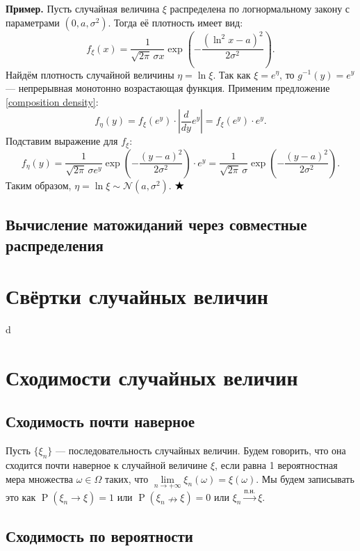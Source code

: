 \documentclass[12pt]{article}
\numberwithin{theorem}{section}
\theoremstyle{definition}
\newenvironment{example}{\indent \textbf{Пример.}}{$ \hfill \bigstar $}
\newcommand{\defin}[2]{\hypertarget{#2}{{\color{red} #1}}}
\newcommand{\prob}{\operatorname{P}}
\begin{document}
	\begin{example}
		Пусть случайная величина \( \xi \) распределена по логнормальному закону с параметрами \( (0, a, \sigma^2) \). Тогда её плотность имеет вид:
		\[
		f_\xi(x) = \frac{1}{\sqrt{2\pi} \, \sigma x} \exp\left( -\frac{(\ln^2 x - a)^2}{2\sigma^2} \right).
		\]
		Найдём плотность случайной величины \( \eta = \ln \xi \). Так как \( \xi = e^\eta \), то \( g^{-1}(y) = e^y \) — непрерывная монотонно возрастающая функция. Применим предложение \ref{composition density}:
		\[
		f_\eta(y) = f_\xi(e^y) \cdot \left| \frac{d}{dy} e^y \right| = f_\xi(e^y) \cdot e^y.
		\]
		Подставим выражение для \( f_\xi \):
		\[
		f_\eta(y) = \frac{1}{\sqrt{2\pi} \, \sigma e^y} \exp\left( -\frac{(y - a)^2}{2\sigma^2} \right) \cdot e^y
		= \frac{1}{\sqrt{2\pi} \, \sigma} \exp\left( -\frac{(y - a)^2}{2\sigma^2} \right).
		\]
		Таким образом, \( \eta = \ln \xi \sim \mathcal{N}(a, \sigma^2) \).
	\end{example}
	
	\subsection{Вычисление матожиданий через совместные распределения}
	
	\section{Свёртки случайных величин}
	
	d
	
	\section{Сходимости случайных величин}
	
	\subsection{Сходимость почти наверное}
	
	Пусть $ \{\xi_n\} $ --- последовательность случайных величин.
	Будем говорить, что она \defin{сходится почти наверное}{almost surely} к случайной величине $ \xi $,
	если равна 1 вероятностная мера множества $ \omega \in \Omega $ таких, что $ \lim\limits_{n \to +\infty} \xi_n(\omega) = \xi(\omega) $. Мы будем записывать это как $ \prob(\xi_n \to \xi) = 1 $
	или $ \prob(\xi_n \nrightarrow \xi) = 0 $ или $ \xi_n \overset{\text{п.н.}}{\to} \xi $.
	
	\subsection{Сходимость по вероятности}
	
\end{document}
